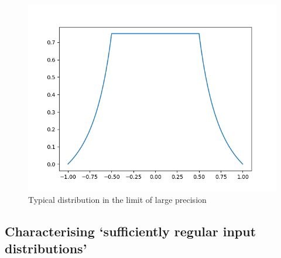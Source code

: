 \documentclass[10pt,a4paper]{article}
\theoremstyle{plain}
\theoremstyle{definition}
\begin{document}
\begin{figure}[h!]
\begin{center}
\includegraphics[scale=0.75]{Code/pics/typical_dist}
\end{center}
\caption{Typical distribution in the limit of large precision}
\label{fig:typical}
\end{figure}


\subsection{Characterising `sufficiently regular input distributions'}
\end{document}

